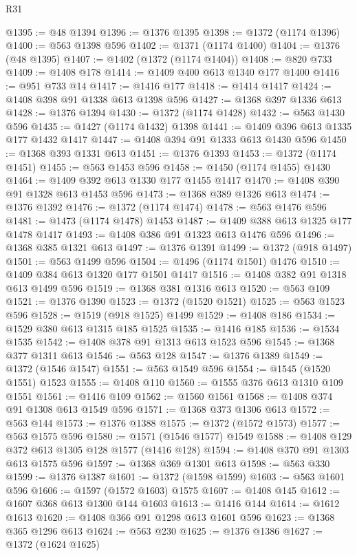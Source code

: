 \begin{lexlean}{R31}
\begin{coremodule}
@1395 := @48 @1394
@1396 := @1376 @1395
@1398 := @1372 (@1174 @1396)
@1400 := @563 @1398 @596
@1402 := @1371 (@1174 @1400)
@1404 := @1376 (@48 @1395)
@1407 := @1402 (@1372 (@1174 @1404))
@1408 := @820 @733
@1409 := @1408 @178
@1414 := @1409 @400 @613 @1340 @177 @1400
@1416 := @951 @733 @14
@1417 := @1416 @177
@1418 := @1414 @1417
@1424 := @1408 @398 @91 @1338 @613 @1398 @596
@1427 := @1368 @397 @1336 @613
@1428 := @1376 @1394
@1430 := @1372 (@1174 @1428)
@1432 := @563 @1430 @596
@1435 := @1427 (@1174 @1432) @1398
@1441 := @1409 @396 @613 @1335 @177 @1432 @1417
@1447 := @1408 @394 @91 @1333 @613 @1430 @596
@1450 := @1368 @393 @1331 @613
@1451 := @1376 @1393
@1453 := @1372 (@1174 @1451)
@1455 := @563 @1453 @596
@1458 := @1450 (@1174 @1455) @1430
@1464 := @1409 @392 @613 @1330 @177 @1455 @1417
@1470 := @1408 @390 @91 @1328 @613 @1453 @596
@1473 := @1368 @389 @1326 @613
@1474 := @1376 @1392
@1476 := @1372 (@1174 @1474)
@1478 := @563 @1476 @596
@1481 := @1473 (@1174 @1478) @1453
@1487 := @1409 @388 @613 @1325 @177 @1478 @1417
@1493 := @1408 @386 @91 @1323 @613 @1476 @596
@1496 := @1368 @385 @1321 @613
@1497 := @1376 @1391
@1499 := @1372 (@918 @1497)
@1501 := @563 @1499 @596
@1504 := @1496 (@1174 @1501) @1476
@1510 := @1409 @384 @613 @1320 @177 @1501 @1417
@1516 := @1408 @382 @91 @1318 @613 @1499 @596
@1519 := @1368 @381 @1316 @613
@1520 := @563 @109
@1521 := @1376 @1390
@1523 := @1372 (@1520 @1521)
@1525 := @563 @1523 @596
@1528 := @1519 (@918 @1525) @1499
@1529 := @1408 @186
@1534 := @1529 @380 @613 @1315 @185 @1525
@1535 := @1416 @185
@1536 := @1534 @1535
@1542 := @1408 @378 @91 @1313 @613 @1523 @596
@1545 := @1368 @377 @1311 @613
@1546 := @563 @128
@1547 := @1376 @1389
@1549 := @1372 (@1546 @1547)
@1551 := @563 @1549 @596
@1554 := @1545 (@1520 @1551) @1523
@1555 := @1408 @110
@1560 := @1555 @376 @613 @1310 @109 @1551
@1561 := @1416 @109
@1562 := @1560 @1561
@1568 := @1408 @374 @91 @1308 @613 @1549 @596
@1571 := @1368 @373 @1306 @613
@1572 := @563 @144
@1573 := @1376 @1388
@1575 := @1372 (@1572 @1573)
@1577 := @563 @1575 @596
@1580 := @1571 (@1546 @1577) @1549
@1588 := @1408 @129 @372 @613 @1305 @128 @1577 (@1416 @128)
@1594 := @1408 @370 @91 @1303 @613 @1575 @596
@1597 := @1368 @369 @1301 @613
@1598 := @563 @330
@1599 := @1376 @1387
@1601 := @1372 (@1598 @1599)
@1603 := @563 @1601 @596
@1606 := @1597 (@1572 @1603) @1575
@1607 := @1408 @145
@1612 := @1607 @368 @613 @1300 @144 @1603
@1613 := @1416 @144
@1614 := @1612 @1613
@1620 := @1408 @366 @91 @1298 @613 @1601 @596
@1623 := @1368 @365 @1296 @613
@1624 := @563 @230
@1625 := @1376 @1386
@1627 := @1372 (@1624 @1625)

\end{coremodule}
\end{lexlean}
